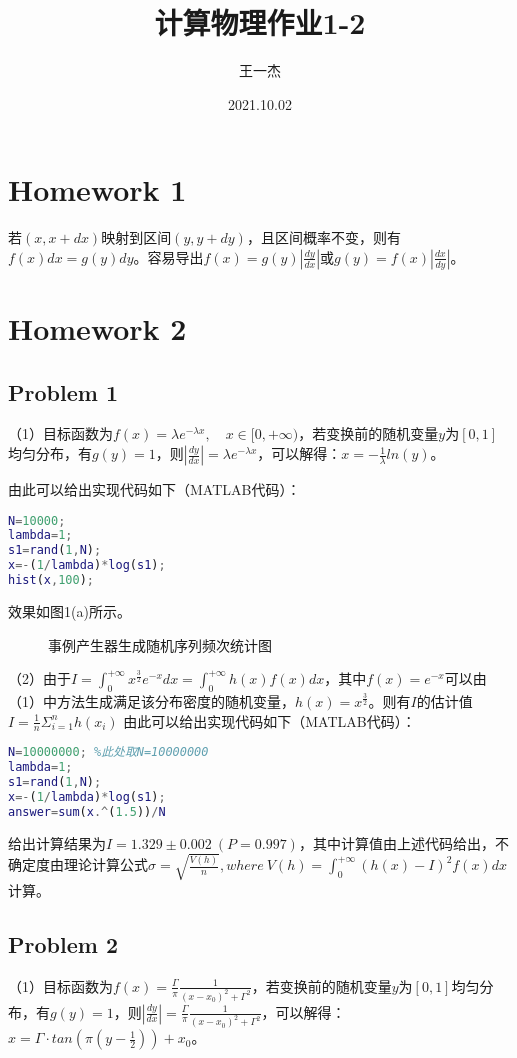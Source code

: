 \documentclass{article}
\title{计算物理作业1-2} %
\author[a]{王一杰} %
\affil[a]{中国科学技术大学}
\date{2021.10.02}%
\begin{document}
\maketitle

\section{Homework 1}
若$(x,x+dx)$映射到区间$(y,y+dy)$，且区间概率不变，则有$f(x)dx=g(y)dy$。容易导出$f(x)=g(y)|\frac{dy}{dx}|$或$g(y)=f(x)|\frac{dx}{dy}|$。
\section{Homework 2}
\subsection{Problem 1}
（1）目标函数为$f ( x ) = \lambda e ^ { - \lambda x } , \quad x \in \lbrack 0 , + \infty )  $，若变换前的随机变量$y$为$[0,1]$均匀分布，有$g(y)=1$，则$|\frac{dy}{dx}|=\lambda e^{-\lambda x}$，可以解得：$x=-\frac{1}{\lambda}ln(y)$。

由此可以给出实现代码如下（MATLAB代码）：
\begin{lstlisting}[language=MATLAB]
N=10000;
lambda=1;
s1=rand(1,N);
x=-(1/lambda)*log(s1);
hist(x,100);
\end{lstlisting}
效果如图1(a)所示。

\begin{figure}[tbp]
 \caption{事例产生器生成随机序列频次统计图}
\end{figure}

（2）由于$I=\int_0^{+\infty}x^{\frac{3}{2}}e^{-x}dx=\int_0^{+\infty}h(x)f(x)dx$，其中$f(x)=e^{-x}$可以由（1）中方法生成满足该分布密度的随机变量，$h(x)=x^{\frac{3}{2}}$。则有$I$的估计值$I=\frac{1}{n}\Sigma_{i=1}^n h(x_i)$
由此可以给出实现代码如下（MATLAB代码）：
\begin{lstlisting}[language=MATLAB]
N=10000000; %此处取N=10000000
lambda=1;
s1=rand(1,N);
x=-(1/lambda)*log(s1);
answer=sum(x.^(1.5))/N
\end{lstlisting}
给出计算结果为$I=1.329\pm0.002\ (P=0.997)$，其中计算值由上述代码给出，不确定度由理论计算公式$\sigma=\sqrt{\frac{V(h)}{n}},where\ V ( h ) = \int _ { 0 } ^ { +\infty } ( h(x) - I ) ^ { 2 } f ( x ) d x  $计算。
\subsection{Problem 2}
（1）目标函数为$f ( x ) = \frac { \Gamma } { \pi } \frac { 1 } { ( x - x _ { 0 } ) ^ { 2 } + \Gamma ^ { 2 } }   $，若变换前的随机变量$y$为$[0,1]$均匀分布，有$g(y)=1$，则$|\frac{dy}{dx}|=\frac { \Gamma } { \pi } \frac { 1 } { ( x - x _ { 0 } ) ^ { 2 } + \Gamma ^ { 2 } }$，可以解得：$x=\Gamma\cdot tan(\pi(y-\frac{1}{2}))+x_0$。
\end{document}
